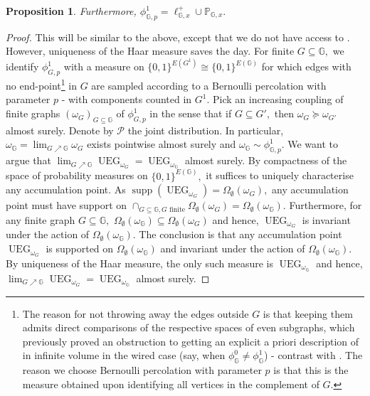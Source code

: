\documentclass[article,11pt,reqno]{amsart}
\newtheorem{proposition}[theorem]{Proposition}
\begin{document}
\begin{appendix}
\begin{proposition}
Furthermore, $\phi^1_{\mathbb{G},p}=\ell^+_{\mathbb{G},x}\cup \mathbb{P}_{\mathbb{G},x}.$
\end{proposition}
\begin{proof}
This will be similar to the above, except that we do not have access to \cite[Theorem 3.10]{hansen2023uniform}. However, uniqueness of the Haar measure saves the day. For finite $G\subseteq \mathbb{G},$ we identify $\phi^1_{G,p}$ with a measure on $\{0,1\}^{E(G^1)}\cong \{0,1\}^{E(\mathbb{G})}$ for which edges with no end-point\footnote{The reason for not throwing away the  edges outside $G$ is that keeping them admits direct comparisons of the respective spaces of even subgraphs, which previously proved an obstruction to getting an explicit a priori description of  in infinite volume in the wired case (say, when $\phi_{\mathbb{G}}^0\neq \phi_{\mathbb{G}}^1$) - contrast with \cite[Theorem 3.11]{hansen2023uniform}. The reason we choose Bernoulli percolation with parameter $p$ is that this is the measure obtained upon identifying all vertices in the complement of $G$.}  in $G$ are sampled according to a Bernoulli percolation with parameter $p$ - with components counted in $G^1$. Pick an increasing coupling of finite graphs $(\omega_G)_{G\subseteq \mathbb{G}}$ of $\phi^1_{G,p}$ in the sense that if $G\subseteq G',$ then $\omega_G\succeq \omega_{G'}$ almost surely. Denote by $\mathcal{P}$ the joint distribution. In particular, $\omega_{\mathbb{G}}=\lim_{G\nearrow \mathbb{G}}\omega_G$ exists pointwise almost surely and $\omega_{\mathbb{G}}\sim \phi^1_{\mathbb{G},p}.$ We want to argue that $\lim_{G\nearrow \mathbb{G}} \operatorname{UEG}_{\omega_G}=\operatorname{UEG}_{\omega_\mathbb{G}}$ almost surely. By compactness of the space of probability measures on $\{0,1\}^{E(\mathbb{G})},$ it suffices to uniquely characterise any accumulation point. As $\operatorname{supp}(\operatorname{UEG}_{\omega_G})=\Omega_{\emptyset}(\omega_G),$ any accumulation point must have support on $\cap_{G\subseteq \mathbb{G}, G \text{ finite}}\Omega_{\emptyset}(\omega_G)=\Omega_{\emptyset}(\omega_{\mathbb{G}}).$ Furthermore, for any finite graph $G\subseteq \mathbb{G},$ $\Omega_{\emptyset}(\omega_{\mathbb{G}})\subseteq \Omega_{\emptyset}(\omega_{G})$ and hence, $\operatorname{UEG}_{\omega_G}$ is invariant under the action of $\Omega_{\emptyset}(\omega_{\mathbb{G}}).$ The conclusion is that any accumulation point $\operatorname{UEG}_{\omega_G}$ is supported on $\Omega_{\emptyset}(\omega_{\mathbb{G}})$ and invariant under the action of $\Omega_{\emptyset}(\omega_{\mathbb{G}})$. By uniqueness of the Haar measure, the only such measure is $\operatorname{UEG}_{\omega_{\mathbb{G}}}$ and hence, $\lim_{G\nearrow \mathbb{G}}\operatorname{UEG}_{\omega_G}=\operatorname{UEG}_{\omega_{\mathbb{G}}}$ almost surely.


\end{proof}
\end{appendix}
\end{document}
